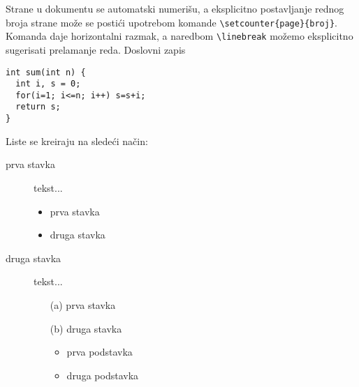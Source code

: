 \documentclass{article}
\begin{document}
Strane u dokumentu se automatski numerišu, a eksplicitno
postavljanje rednog broja strane može se postići upotrebom
komande \linebreak[4] \verb|\setcounter{page}{broj}|. Komanda
\hspace{10mm} daje horizontalni razmak, a na\-red\-bom
\verb|\linebreak| možemo eksplicitno sugerisati prelamanje reda.
\bigskip
Doslovni zapis 
\begin{minipage}[t]{60cm}
\begin{verbatim}
int sum(int n) {
  int i, s = 0;
  for(i=1; i<=n; i++) s=s+i;
  return s;
}
\end{verbatim}
\end{minipage}
\vspace{3\baselineskip}
\noindent Liste se kreiraju na sledeći način:
\begin{description}
\item[prva stavka] tekst...
\begin{itemize}
\item prva stavka
\item druga stavka
\end{itemize}
\item[druga stavka] tekst...
\begin{itemize}
\item[(a)] prva stavka
\item[(b)] druga stavka
\begin{itemize}
\item prva podstavka
\item druga podstavka
\end{itemize}
\end{itemize}
\end{description}
\end{document}
